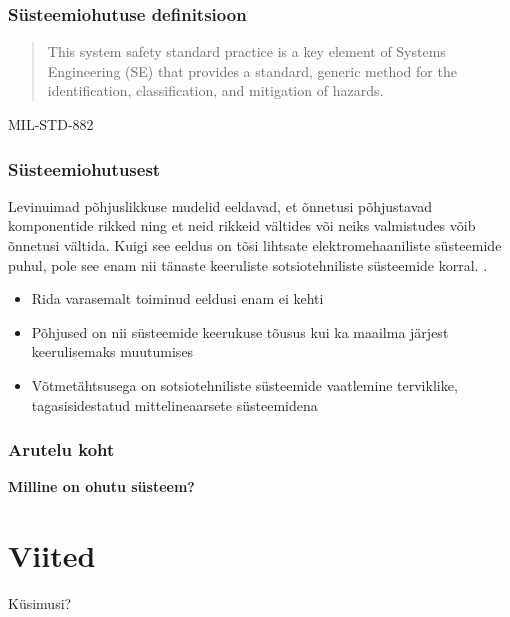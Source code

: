 \begin{frame}[fragile]
  \frametitle{Süsteemiohutuse definitsioon}
	\begin{center}
		\begin{quote}
			This system safety standard practice is a key element of Systems Engineering (SE) that provides a standard, generic method for the identification, classification, and mitigation of hazards.
		\end{quote}
	\end{center}
			MIL-STD-882
	
\end{frame}

\begin{frame}[fragile]
  \frametitle{Süsteemiohutusest}
	Levinuimad põhjuslikkuse mudelid eeldavad, et õnnetusi põhjustavad komponentide rikked ning et neid rikkeid vältides või neiks valmistudes võib õnnetusi vältida. Kuigi see eeldus on tõsi lihtsate elektromehaaniliste süsteemide puhul, pole see enam nii tänaste keeruliste sotsiotehniliste süsteemide korral. \cite{leveson2011engineering}.
	\begin{itemize}
		\item Rida varasemalt toiminud eeldusi enam ei kehti
		\item Põhjused on nii süsteemide keerukuse tõusus kui ka maailma järjest keerulisemaks muutumises
		\item Võtmetähtsusega on sotsiotehniliste süsteemide vaatlemine terviklike, tagasisidestatud mittelineaarsete süsteemidena
	\end{itemize}
\end{frame}


\begin{frame}[fragile]
  \frametitle{Arutelu koht}
		\begin{center}
			\textbf{Milline on ohutu süsteem?}
		\end{center}
\end{frame}


\section{Viited}

\begin{frame}[t,allowframebreaks,]
  	
	 

\end{frame}

\begin{frame}[plain]
	\begin{center}Küsimusi?\end{center}
\end{frame}


